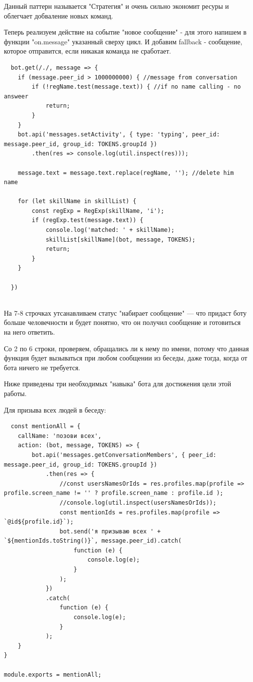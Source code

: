 \documentclass[bachelor, och, coursework, times]{SCWorks}
\begin{document}
Данный паттерн называется "Стратегия" и очень сильно экономит ресуры и облегчает
добваление новых команд. \cite{Stoyan}

Теперь реализуем действие на событие "новое сообщение" - для этого напишем в функции "on.message"
указанный сверху цикл. И добавим fallback - сообщение, которое отправится, если никакая команда не сработает.

\begin{lstlisting}
  bot.get(/./, message => {
    if (message.peer_id > 1000000000) { //message from conversation
        if (!regName.test(message.text)) { //if no name calling - no answeer
            return;
        }
    }
    bot.api('messages.setActivity', { type: 'typing', peer_id: message.peer_id, group_id: TOKENS.groupId })
        .then(res => console.log(util.inspect(res)));

    message.text = message.text.replace(regName, ''); //delete him name

    for (let skillName in skillList) {
        const regExp = RegExp(skillName, 'i');
        if (regExp.test(message.text)) {
            console.log('matched: ' + skillName);
            skillList[skillName](bot, message, TOKENS);
            return;
        }
    }

  })


\end{lstlisting}

На 7-8 строчках утсанавливаем статус "набирает сообщение" --- что придаст
боту больше человечности и будет понятно, что он получил сообщение и готовиться на него ответить.

Со 2 по 6 строки, проверяем, обращались ли к нему по имени, потому что данная функция будет
вызываться при любом сообщении из беседы, даже тогда, когда от бота ничего не требуется.


Ниже приведены три необходимых "навыка" бота для достижения цели этой работы.

Для призыва всех людей в беседу:
\begin{lstlisting}
  const mentionAll = {
    callName: 'позови всех',
    action: (bot, message, TOKENS) => {
        bot.api('messages.getConversationMembers', { peer_id: message.peer_id, group_id: TOKENS.groupId })
            .then(res => {
                //const usersNamesOrIds = res.profiles.map(profile => profile.screen_name != '' ? profile.screen_name : profile.id );
                //console.log(util.inspect(usersNamesOrIds));
                const mentionIds = res.profiles.map(profile => `@id${profile.id}`);
                bot.send('я призываю всех ' + `${mentionIds.toString()}`, message.peer_id).catch(
                    function (e) {
                        console.log(e);
                    }
                );
            })
            .catch(
                function (e) {
                    console.log(e);
                }
            );
    }
}

module.exports = mentionAll;
\end{lstlisting}
\end{document}
